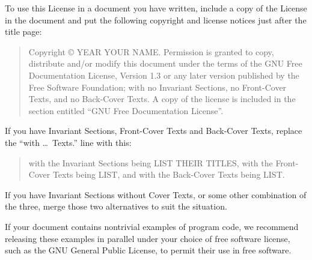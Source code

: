 \ifdefined\chs

\fi

\ifdefined\eng
To use this License in a document you have written, include a copy of
the License in the document and put the following copyright and
license notices just after the title page:
\fi

\ifdefined\chs

\fi

\ifdefined\eng
\bigskip
\begin{quote}
    Copyright \copyright{}  YEAR  YOUR NAME.
    Permission is granted to copy, distribute and/or modify this document
    under the terms of the GNU Free Documentation License, Version 1.3
    or any later version published by the Free Software Foundation;
    with no Invariant Sections, no Front-Cover Texts, and no Back-Cover Texts.
    A copy of the license is included in the section entitled ``GNU
    Free Documentation License''.
\end{quote}
\bigskip
    
If you have Invariant Sections, Front-Cover Texts and Back-Cover Texts,
replace the ``with \dots\ Texts.'' line with this:
\fi

\ifdefined\chs

\fi

\ifdefined\eng
\bigskip
\begin{quote}
    with the Invariant Sections being LIST THEIR TITLES, with the
    Front-Cover Texts being LIST, and with the Back-Cover Texts being LIST.
\end{quote}
\bigskip
    
If you have Invariant Sections without Cover Texts, or some other
combination of the three, merge those two alternatives to suit the
situation.
\fi

\ifdefined\chs

\fi

\ifdefined\eng
If your document contains nontrivial examples of program code, we
recommend releasing these examples in parallel under your choice of
free software license, such as the GNU General Public License,
to permit their use in free software.
\fi
